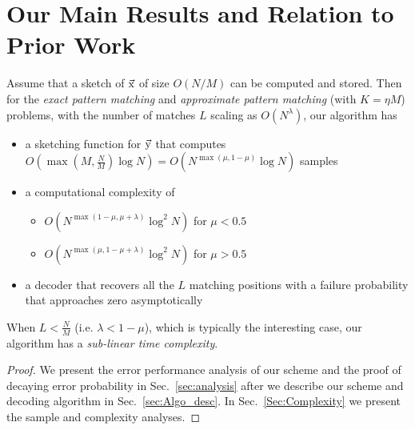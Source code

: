 \section{Our Main Results and Relation to Prior Work}
\label{sec:mainresults}
\begin{theorem}
Assume that a sketch of $\vec{\mathrm{x}}$ of size $O(N/M)$ can be computed and stored. Then for the {\it exact pattern matching} and {\it approximate pattern matching} (with $K = \eta M$) problems, with the number of matches $L$ scaling as $O(N^{\lambda})$, our algorithm has
\begin{itemize}
 \item a sketching function for $\vec{\mathrm{y}}$ that computes $O(\max(M,\frac{N}{M})\log N)=O(N^{\max(\mu,1-\mu)}\log N)$ samples
 \item a computational complexity of
 \begin{itemize}
 \item  $O(N^{\max(1-\mu,\mu+\lambda)}\log^2 N)$ for $\mu<0.5$
  \item  $O(N^{\max(\mu,1-\mu+\lambda)}\log^2 N)$ for $\mu>0.5$
\end{itemize}
 \item a decoder that recovers all the $L$ matching positions with a failure probability that approaches zero asymptotically
 \end{itemize}
When $L<\frac{N}{M}$ (i.e. $\lambda<1-\mu$), which is typically the interesting case, our algorithm has a {\it sub-linear time complexity}.
\end{theorem}
\begin{proof}
We present the error performance analysis of our scheme and the proof of decaying error probability in Sec.~\ref{sec:analysis} after we describe our scheme and  decoding algorithm in Sec.~\ref{sec:Algo_desc}. In Sec.~\ref{Sec:Complexity} we present the sample and complexity analyses.
\end{proof}
